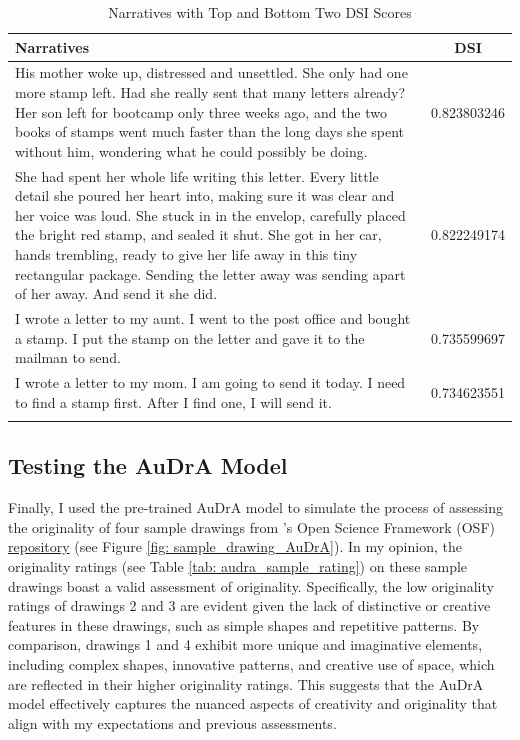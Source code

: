 \documentclass[../Proposal.tex]{subfiles}
\begin{document}
\begin{longtable}{|p{13cm}|c|}
    \hline
    Narratives & DSI \\ 
    \hline
    His mother woke up, distressed and unsettled. She only had one more stamp left. Had she really sent that many letters already? Her son left for bootcamp only three weeks ago, and the two books of stamps went much faster than the long days she spent without him, wondering what he could possibly be doing. & 0.823803246 \\ 
    \hline
    She had spent her whole life writing this letter. Every little detail she poured her heart into, making sure it was clear and her voice was loud. She stuck in in the envelop, carefully placed the bright red stamp, and sealed it shut. She got in her car, hands trembling, ready to give her life away in this tiny rectangular package. Sending the letter away was sending apart of her away. And send it she did. & 0.822249174 \\
    \hline
    I wrote a letter to my aunt. I went to the post office and bought a stamp. I put the stamp on the letter and gave it to the mailman to send. & 0.735599697 \\
    \hline
    I wrote a letter to my mom. I am going to send it today. I need to find a stamp first. After I find one, I will send it. & 0.734623551 \\
    \hline
    \caption{Narratives with Top and Bottom Two DSI Scores}
    \label{tab: narratives with top and bottom 2 DSI scores}
\end{longtable}

\subsection*{Testing the AuDrA Model}
Finally, I used the pre-trained AuDrA model to simulate the process of assessing the originality of four sample drawings from \textcite{patterson_audra_2023}'s Open Science Framework (OSF) \href{https://osf.io/kqn9v/}{repository} (see Figure \ref{fig: sample_drawing_AuDrA}). In my opinion, the originality ratings (see Table \ref{tab: audra_sample_rating}) on these sample drawings boast a valid assessment of originality. Specifically, the low originality ratings of drawings 2 and 3 are evident given the lack of distinctive or creative features in these drawings, such as simple shapes and repetitive patterns. By comparison, drawings 1 and 4 exhibit more unique and imaginative elements, including complex shapes, innovative patterns, and creative use of space, which are reflected in their higher originality ratings. This suggests that the AuDrA model effectively captures the nuanced aspects of creativity and originality that align with my expectations and previous assessments.
\end{document}
